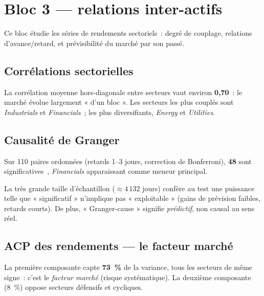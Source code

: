 \chapter{Bloc 3 --- relations inter-actifs}
\label{chap:bloc3}

Ce bloc étudie les séries de rendements sectoriels~: degré de couplage,
relations d'avance/retard, et prévisibilité du marché par son passé.

\section{Corrélations sectorielles}
La corrélation moyenne hors-diagonale entre secteurs vaut environ
\textbf{0,70}~: le marché évolue largement « d'un bloc ». Les secteurs les
plus couplés sont \emph{Industrials} et \emph{Financials}~; les plus
diversifiants, \emph{Energy} et \emph{Utilities}.

\section{Causalité de Granger}
\label{sec:b3-granger}
Sur 110 paires ordonnées (retards 1--3 jours, correction de Bonferroni),
\textbf{48} sont significatives~\cite{granger1969}, \emph{Financials}
apparaissant comme meneur principal.

\begin{limites}
La très grande taille d'échantillon (\(\approx 4\,132\) jours) confère au
test une puissance telle que « significatif » n'implique pas
« exploitable » (gains de prévision faibles, retards courts). De plus,
« Granger-cause » signifie \emph{prédictif}, non causal au sens réel.
\end{limites}

\section{ACP des rendements --- le facteur marché}
La première composante capte \textbf{73~\%} de la variance, tous les
secteurs de même signe~: c'est le \emph{facteur marché} (risque
systématique). La deuxième composante (8~\%) oppose secteurs défensifs et
cycliques.


